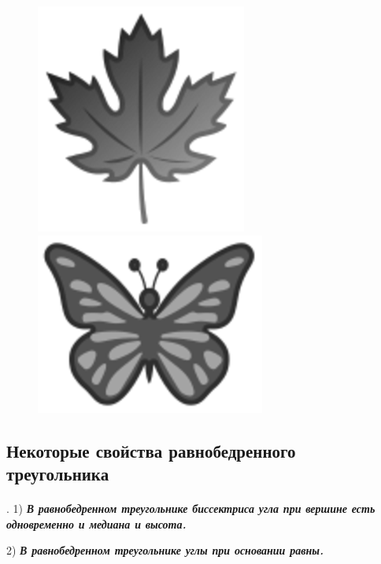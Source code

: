 \documentclass[oneside]{book}
\begin{document}
\begin{figure}[h!]
\begin{minipage}{.48\textwidth}
\centering
\includegraphics{eps/klenovyj-list}
\caption{}\label{1938/ris-42}
\end{minipage}\hfill
\begin{minipage}{.48\textwidth}
\centering
\includegraphics{eps/babochka}
\caption{}\label{1938/ris-43}
\end{minipage}
\end{figure}

\subsection*{Некоторые свойства равнобедренного треугольника}

\paragraph{}\label{1938/38}
.
1) \textbf{\emph{В равнобедренном треугольнике биссектриса угла при вершине есть одновременно и медиана и высота.}}

2) \textbf{\emph{В равнобедренном треугольнике углы при основании равны.}}
\end{document}

